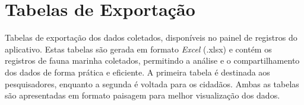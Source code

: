 
\chapter{Tabelas de Exportação}
\label{sec:anexo-tabela-exportacao}

Tabelas de exportação dos dados coletados, disponíveis no painel de registros do aplicativo. Estas tabelas são gerada em formato \textit{Excel} (.xlsx) e contém os registros de fauna marinha coletados, permitindo a análise e o compartilhamento dos dados de forma prática e eficiente. A primeira tabela é destinada aos pesquisadores, enquanto a segunda é voltada para os cidadãos. Ambas as tabelas são apresentadas em formato paisagem para melhor visualização dos dados.




